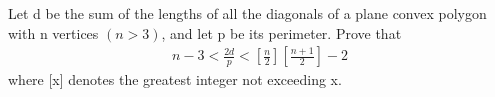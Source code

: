 \item Let d be the sum of the lengths of all the diagonals of a plane convex polygon with n vertices $(n > 3)$, and let p be its perimeter. Prove that
\begin{align*}
n-3 < \frac{2d}{p} < [\frac{n}{2}] [\frac{n + 1}{2}] - 2
\end{align*}
where [x] denotes the greatest integer not exceeding x.







